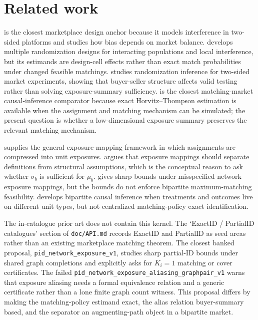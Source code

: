 \documentclass[11pt]{article}
\theoremstyle{definition}
\theoremstyle{plain}
\theoremstyle{remark}
\begin{document}
\section{Related work}
\citet{JohariLiLiskovichWeintraub2022} is the closest marketplace design anchor because it models interference in two-sided platforms and studies how bias depends on market balance. \citet{MasoeroVijaykumarRichardsonMcQueenRosenBurdickBajariImbens2026} develops multiple randomization designs for interacting populations and local interference, but its estimands are design-cell effects rather than exact match probabilities under changed feasible matchings. \citet{LiuShaikhToulis2025} studies randomization inference for two-sided market experiments, showing that buyer-seller structure affects valid testing rather than solving exposure-summary sufficiency. \citet{Chen2019} is the closest matching-market causal-inference comparator because exact Horvitz--Thompson estimation is available when the assignment and matching mechanism can be simulated; the present question is whether a low-dimensional exposure summary preserves the relevant matching mechanism.

\citet{AronowSamii2017} supplies the general exposure-mapping framework in which assignments are compressed into unit exposures. \citet{Savje2024} argues that exposure mappings should separate definitions from structural assumptions, which is the conceptual reason to ask whether $\sigma_b$ is sufficient for $\mu_b$. \citet{SchroderOprescuFeuerriegelKallus2026} gives sharp bounds under misspecified network exposure mappings, but the bounds do not enforce bipartite maximum-matching feasibility. \citet{ZiglerPapadogeorgou2018} develops bipartite causal inference when treatments and outcomes live on different unit types, but not centralized matching-policy exact identification.

The in-catalogue prior art does not contain this kernel. The `ExactID / PartialID catalogues' section of \texttt{doc/API.md} records ExactID and PartialID as seed areas rather than an existing marketplace matching theorem. The closest banked proposal, \texttt{pid\_network\_exposure\_v1}, studies sharp partial-ID bounds under shared graph completions and explicitly asks for $K_i=1$ matching or cover certificates. The failed \texttt{pid\_network\_exposure\_aliasing\_graphpair\_v1} warns that exposure aliasing needs a formal equivalence relation and a generic certificate rather than a lone finite graph count witness. This proposal differs by making the matching-policy estimand exact, the alias relation buyer-summary based, and the separator an augmenting-path object in a bipartite market.
\end{document}
